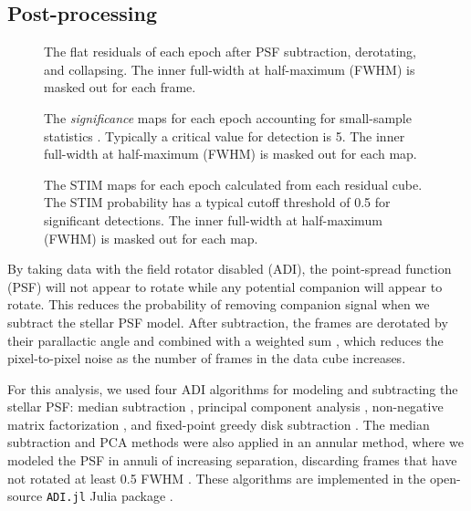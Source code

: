 \documentclass[twocolumn,linenumbers]{aastex631}
\begin{document}
\subsection{Post-processing}

\begin{figure*}
    \centering
    \caption{The flat residuals of each epoch after PSF subtraction, derotating, and collapsing. The inner full-width at half-maximum (FWHM) is masked out for each frame.}
    \label{fig:residuals}
\end{figure*}

\begin{figure*}
    \centering
    \caption{The \textit{significance} maps for each epoch accounting for small-sample statistics \citep{mawet_fundamental_2014}. Typically a critical value for detection is 5. The inner full-width at half-maximum (FWHM) is masked out for each map.}
    \label{fig:sig}
\end{figure*}

\begin{figure*}
    \centering
    \caption{The STIM maps for each epoch calculated from each residual cube. The STIM probability has a typical cutoff threshold of 0.5 for significant detections. The inner full-width at half-maximum (FWHM) is masked out for each map.}
    \label{fig:stim}
\end{figure*}

By taking data with the field rotator disabled (ADI), the point-spread function (PSF) will not appear to rotate while any potential companion will appear to rotate. This reduces the probability of removing companion signal when we subtract the stellar PSF model. After subtraction, the frames are derotated by their parallactic angle and combined with a weighted sum \citep{bottomNoiseweightedAngularDifferential2017a}, which reduces the pixel-to-pixel noise as the number of frames in the data cube increases.

For this analysis, we used four ADI algorithms for modeling and subtracting the stellar PSF: median subtraction \citep{maroisAngularDifferentialImaging2006}, principal component analysis \citep[PCA, also referred to as KLIP;][]{soummerDetectionCharacterizationExoplanets2012a}, non-negative matrix factorization \citep[NMF;][]{renNonnegativeMatrixFactorization2018a}, and fixed-point greedy disk subtraction \citep[GreeDS;][]{papairetReferencelessAlgorithmCircumstellar2019a,pairetMAYONNAISEMorphologicalComponents2020}. The median subtraction and PCA methods were also applied in an annular method, where we modeled the PSF in annuli of increasing separation, discarding frames that have not rotated at least 0.5 FWHM \citep{maroisAngularDifferentialImaging2006}. These algorithms are implemented in the open-source \texttt{ADI.jl} Julia package \citep{lucasADIJlJulia2020}.
\end{document}
